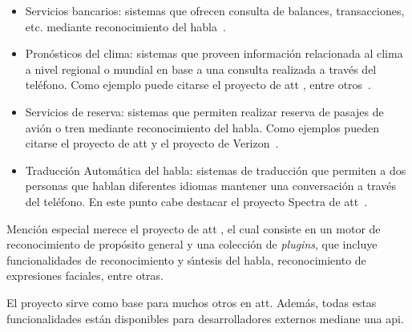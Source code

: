 \begin{itemize}
	\item Servicios bancarios: sistemas que ofrecen consulta de balances, transacciones, etc. mediante
	reconocimiento del \mbox{habla \cite{PreeEnhancing1999}}.

	\item Pron\'osticos del clima: sistemas que proveen informaci\'on relacionada al clima a nivel regional o mundial
	en base a una consulta realizada a trav\'es del tel\'efono. Como ejemplo puede citarse el proyecto 
	de \gls{att} \cite{ZueJupiter2000}, entre \mbox{otros \cite{ZibertBiliengual2003}}.

	\item Servicios de reserva: sistemas que permiten realizar reserva de pasajes de avi\'on o tren mediante
	reconocimiento del habla. Como ejemplos pueden citarse el proyecto  de \gls{att} \cite{Seneff2000Dialogue} 
    y el proyecto  de \mbox{Verizon \cite{StallardEvaluation2001}}.

	\item Traducci\'on Autom\'atica del habla: sistemas de traducci\'on que permiten a dos personas que hablan
	diferentes idiomas mantener una conversaci\'on a trav\'es del tel\'efono. En este punto cabe destacar el
	proyecto Spectra de \mbox{\gls{att} \cite{Rangarajan2012}}.
\end{itemize}

Menci\'on especial merece el proyecto  de \gls{att} \cite{AttWatson}, el cual consiste en un motor de
reconocimiento de prop\'osito general y una colecci\'on de \emph{plugins}, que incluye funcionalidades de
reconocimiento y s{\'\i}ntesis del habla, reconocimiento de expresiones faciales, entre otras. 

El proyecto  sirve como base para muchos otros en \gls{att}. 
Adem\'as, todas estas funcionalidades est\'an disponibles para desarrolladores externos mediane una \gls{api}. 